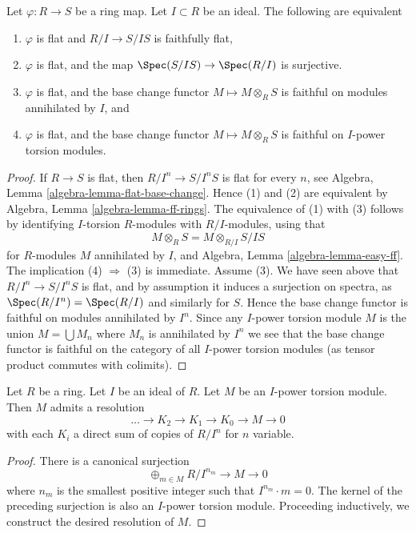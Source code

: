 \begin{lemma}
\label{lemma-characterize-flatness-on-torsion}
Let $\varphi : R \to S$ be a ring map. Let $I \subset R$ be an ideal.
The following are equivalent
\begin{enumerate}
\item $\varphi$ is flat and $R/I \to S/IS$ is faithfully flat,
\item $\varphi$ is flat, and the map
$\Spec(S/IS) \to \Spec(R/I)$ is surjective.
\item $\varphi$ is flat, and the base change functor
$M \mapsto M \otimes_R S$ is faithful on modules annihilated by $I$, and
\item $\varphi$ is flat, and the base change functor
$M \mapsto M \otimes_R S$ is faithful on $I$-power torsion modules.
\end{enumerate}
\end{lemma}

\begin{proof}
If $R \to S$ is flat, then $R/I^n \to S/I^nS$ is flat for every $n$, see
Algebra, Lemma \ref{algebra-lemma-flat-base-change}.
Hence (1) and (2) are equivalent by
Algebra, Lemma \ref{algebra-lemma-ff-rings}.
The equivalence of (1) with (3) follows by identifying $I$-torsion
$R$-modules with $R/I$-modules, using that
$$
M \otimes_R S = M \otimes_{R/I} S/IS
$$
for $R$-modules $M$ annihilated by $I$, and
Algebra, Lemma \ref{algebra-lemma-easy-ff}.
The implication (4) $\Rightarrow$ (3) is immediate. Assume (3). We have
seen above that $R/I^n \to S/I^nS$ is flat, and by assumption it induces
a surjection on spectra, as $\Spec(R/I^n) = \Spec(R/I)$ and
similarly for $S$. Hence the base change functor is faithful on modules
annihilated by $I^n$. Since any $I$-power torsion module $M$ is the union
$M = \bigcup M_n$ where $M_n$ is annihilated by $I^n$ we see that the base
change functor is faithful on the category of all $I$-power torsion modules
(as tensor product commutes with colimits).
\end{proof}

\begin{lemma}
\label{lemma-I-power-torsion-presentation}
Let $R$ be a ring.
Let $I$ be an ideal of $R$.
Let $M$ be an $I$-power torsion module.
Then $M$ admits a resolution
$$
\ldots \to K_2 \to K_1 \to K_0 \to M \to 0
$$
with each $K_i$ a direct sum of copies of $R/I^n$ for $n$ variable.
\end{lemma}

\begin{proof}
There is a canonical surjection
$$
\oplus_{m \in M} R/I^{n_m} \to M \to 0
$$
where $n_m$ is the smallest positive integer such that $I^{n_m} \cdot m = 0$.
The kernel of the preceding surjection is also an $I$-power torsion module.
Proceeding inductively, we construct the desired resolution of $M$.
\end{proof}

